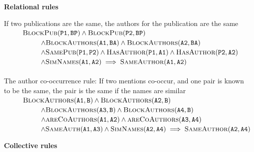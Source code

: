 \documentclass{article}
\begin{document}
                \textbf{Relational rules}
                
                    If two publications are the same, the authors for the publication are the same \\
                    $ ~~~~~~~~\textsc{BlockPub}(\texttt{P1}, \texttt{BP})
                      \wedge \textsc{BlockPub}(\texttt{P2}, \texttt{BP})$ \\
                    $ ~~~~~~~~~~~~~~~~ \wedge \textsc{BlockAuthors}(\texttt{A1}, \texttt{BA})
                      \wedge \textsc{BlockAuthors}(\texttt{A2}, \texttt{BA}) $ \\
                    $ ~~~~~~~~~~~~~~~~  \wedge \textsc{SamePub}(\texttt{P1},\texttt{P2})
                      \wedge \textsc{HasAuthor}(\texttt{P1},\texttt{A1})
                      \wedge \textsc{HasAuthor}(\texttt{P2},\texttt{A2})$ \\
                    $ ~~~~~~~~~~~~~~~~  \wedge \textsc{SimNames}(\texttt{A1},\texttt{A2})
                      \implies \textsc{SameAuthor}(\texttt{A1},\texttt{A2})$\\ \\
                    The author co-occurrence rule: If two mentions co-occur, and one pair is known to be the same, the pair is the same if the names are similar \\
                    $ ~~~~~~~~\textsc{BlockAuthors}(\texttt{A1}, \texttt{B})
                      \wedge \textsc{BlockAuthors}(\texttt{A2}, \texttt{B})$ \\
                    $ ~~~~~~~~~~~~~~~~ \wedge \textsc{BlockAuthors}(\texttt{A3}, \texttt{B})
                      \wedge \textsc{BlockAuthors}(\texttt{A4}, \texttt{B}) $  \\
                    $ ~~~~~~~~~~~~~~~~ \wedge \textsc{areCoAuthors}(\texttt{A1},\texttt{A2})
                      \wedge \textsc{areCoAuthors}(\texttt{A3},\texttt{A4})$  \\
                    $ ~~~~~~~~~~~~~~~~ \wedge \textsc{SameAuth}(\texttt{A1},\texttt{A3})
                      \wedge \textsc{SimNames}(\texttt{A2},\texttt{A4})
                      \implies \textsc{SameAuthor}(\texttt{A2},\texttt{A4})$
                      
                \textbf{Collective rules}
                
\end{document}
